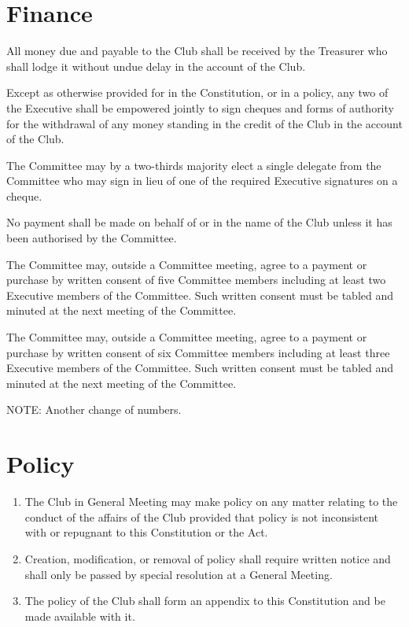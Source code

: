 \documentclass[11pt]{article} %
\begin{document}
\section{Finance}
\begin{enumerate}
	\item All money due and payable to the Club shall be received by the Treasurer who shall lodge it without undue delay in the account of the Club.
	\item Except as otherwise provided for in the Constitution, or in a policy, any two of the Executive shall be empowered jointly to sign cheques and forms of authority for the withdrawal of any money standing in the credit of the Club in the account of the Club.
	\item The Committee may by a two-thirds majority elect a single delegate from the Committee who may sign in lieu of one of the required Executive signatures on a cheque.
	\item No payment shall be made on behalf of or in the name of the Club unless it has been authorised by the Committee.
	{\color{red}\item The Committee may, outside a Committee meeting, agree to a payment or purchase by written consent of five Committee members including at least two Executive members of the Committee. Such written consent must be tabled and minuted at the next meeting of the Committee.}
	{\color{ForestGreen}\item The Committee may, outside a Committee meeting, agree to a payment or purchase by written consent of six Committee members including at least three Executive members of the Committee. Such written consent must be tabled and minuted at the next meeting of the Committee.}
\end{enumerate}
{\color{Cyan}NOTE:
Another change of numbers.
}

\section{Policy}
\begin{enumerate}
	\item The Club in General Meeting may make policy on any matter relating to the conduct of the affairs of the Club provided that policy is not inconsistent with or repugnant to this Constitution or the Act.
	\item Creation, modification, or removal of policy shall require written notice and shall only be passed by special resolution at a General Meeting.
	\item The policy of the Club shall form an appendix to this Constitution and be made available with it.
\end{enumerate}
\end{document}
